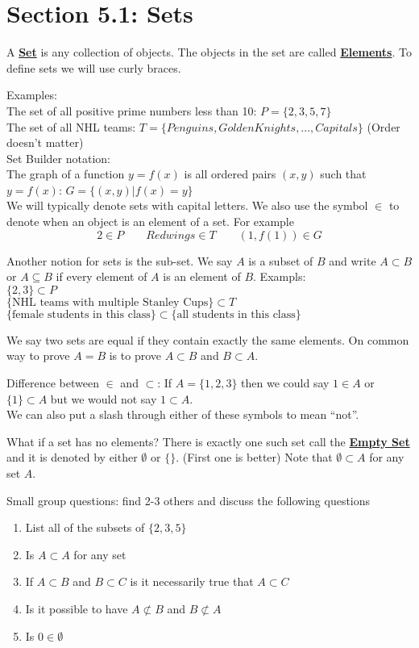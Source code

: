 \documentclass[14,fleqn]{article}
\newcommand{\defn}[1]{\textbf{\underline{#1}}}
\begin{document}
\section{Section 5.1: Sets}
A \defn{Set} is any collection of objects. The objects in the set are called \defn{Elements}. To define sets we will use curly braces.

Examples:\\
The set of all positive prime numbers less than 10: $P=\{2,3,5,7\}$\\
The set of all NHL teams: $T=\{Penguins, Golden Knights, \dots, Capitals\}$ (Order doesn't matter)\\
Set Builder notation:\\
The graph of a function $y=f(x)$ is all ordered pairs $(x,y)$ such that $y=f(x)$: $G=\{(x,y)| f(x)=y\}$\\

We will typically denote sets with capital letters. We also use the symbol $\in$ to denote when an object is an element of a set. For example\\
\[
	2\in P \qquad Redwings\in T \qquad (1,f(1))\in G
\]


Another notion for sets is the sub-set. We say $A$ is a subset of $B$ and write $A\subset B$ or $A\subseteq B$ if every element of $A$ is an element of $B.$
Exampls:\\
$\{2,3\}\subset P$\\
$\{\text{NHL teams with multiple Stanley Cups}\}\subset T$\\
$\{\text{female students in this class}\}\subset \{\text{all students in this class}\}$

We say two sets are equal if they contain exactly the same elements. On common way to prove $A=B$ is to prove $A\subset B$ and $B\subset A.$

Difference between $\in$ and $\subset$: If $A=\{1,2,3\}$ then we could say $1\in A$ or $\{1\}\subset A$ but we would not say $1\subset A.$\\
We can also put a slash through either of these symbols to mean ``not''.

What if a set has no elements? There is exactly one such set call the \defn{Empty Set} and it is denoted by either $\emptyset$ or $\{\}.$ (First one is better) Note that $\emptyset \subset A$ for any set $A.$

Small group questions: find 2-3 others and discuss the following questions\\
\begin{enumerate}
	\item List all of the subsets of $\{2,3,5\}$
	\item Is $A\subset A$ for any set
	\item If $A\subset B$ and $B\subset C$ is it necessarily true that $A\subset C$
	\item Is it possible to have $A\not\subset B$ and $B\not\subset A$
	\item Is $0\in \emptyset$
\end{enumerate}
\end{document}
